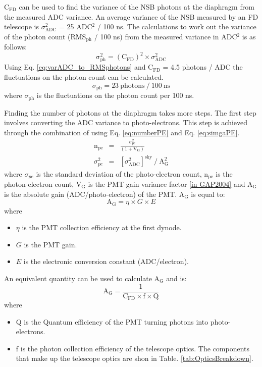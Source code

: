 C$_{\mathrm{FD}}$ can be used to find the variance of the NSB photons at the diaphragm from the measured ADC variance. An average variance of the NSB measured by an FD telescope is $\sigma^2_{\mathrm{ADC}}$ = 25 ADC$^2$ / 100 ns. The calculations to work out the variance of the photon count (RMS$_{\mathrm{ph}}$ / 100 ns) from the measured variance in ADC$^2$ is as follows:
\begin{equation}
\mathrm{\sigma}^2_{\mathrm{ph}} = (\mathrm{C}_{\mathrm{FD}})^2 \times \sigma^2_{\mathrm{ADC}} \label{eq:varADC_to_RMSphotons}
\end{equation}
Using Eq. \ref{eq:varADC_to_RMSphotons} and C$_{\mathrm{FD}}$ = 4.5 photons / ADC the fluctuations on the photon count can be calculated.
\begin{equation}
\sigma_{\mathrm{ph}} = 23 \ \mathrm{photons} \ / \ 100 \ \mathrm{ns} \nonumber
\end{equation}
where $\sigma_{\mathrm{ph}}$ is the fluctuations on the photon count per 100 ns.

Finding the number of photons at the diaphragm takes more steps. The first step involves converting the ADC variance to photo-electrons. This step is achieved through the combination of using Eq. \ref{eq:numberPE} and Eq. \ref{eq:simgaPE}.
\begin{eqnarray}
\mathrm{n}_{\mathrm{pe}} &=& \frac{\sigma^2_{pe}}{(1 + \mathrm{V}_{\mathrm{G}})} \label{eq:numberPE} \\
\sigma^2_{pe} &=& [\sigma^2_{\mathrm{ADC}}]^{\mathrm{sky}} \ / \ \mathrm{A}^2_{\mathrm{G}} \label{eq:simgaPE}
\end{eqnarray}
where $\sigma_{pe}$ is the standard deviation of the photo-electron count, n$_{\mathrm{pe}}$ is the photon-electron count, V$_{\mathrm{G}}$ is the PMT gain variance factor \ref{in GAP2004} and A$_{\mathrm{G}}$ is the absolute gain (ADC/photo-electron) of the PMT. A$_{\mathrm{G}}$ is equal to:
\begin{equation}\label{eq:abs_gain}
\mathrm{A}_{\mathrm{G}} = \eta \times G \times E 
\end{equation}
where
\begin{itemize}
\item[] $\eta$ is the PMT collection efficiency at the first dynode.
\item[] $G$ is the PMT gain.
\item[] $E$ is the electronic conversion constant (ADC/electron).
\end{itemize}
An equivalent quantity can be used to calculate $\mathrm{A}_{\mathrm{G}}$ and is:
\begin{equation}\label{eq:abs_gain_alt}
\mathrm{A}_{\mathrm{G}} = \frac{1}{\mathrm{C}_{\mathrm{FD}}\times \mathrm{f} \times \mathrm{Q}}
\end{equation}
where
\begin{itemize}
\item[] Q is the Quantum efficiency of the PMT turning photons into photo-electrons.
\item[] f is the photon collection efficiency of the telescope optics. The components that make up the telescope optics are shon in Table. \ref{tab:OpticsBreakdown}.
\end{itemize}

